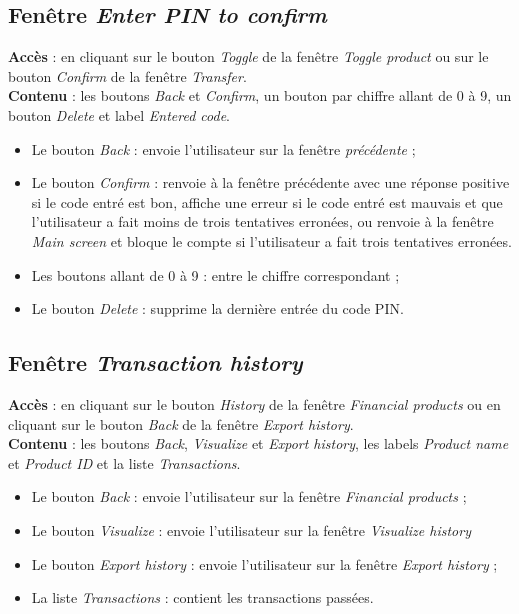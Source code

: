 \documentclass{article}
\newcommand{\navbutton}[2]{Le bouton \emph{#1} : envoie l'utilisateur sur la fenêtre \emph{#2}}
\newcommand{\access}[1]{ \noindent\textbf{Accès} : #1 \\}
\newcommand{\content}[1]{\textbf{Contenu} : #1}
\begin{document}
\subsection{Fenêtre \emph{Enter PIN to confirm}}
\access{en cliquant sur le bouton \emph{Toggle} de la fenêtre \emph{Toggle product} ou sur le bouton \emph{Confirm} de la fenêtre \emph{Transfer}.}
\content{les boutons \emph{Back} et \emph{Confirm}, un bouton par chiffre allant de 0 à 9, un bouton \emph{Delete} et label \emph{Entered code}.}
\begin{itemize}
\item \navbutton{Back}{précédente} ;
\item Le bouton \emph{Confirm} : renvoie à la fenêtre précédente avec une réponse positive si le code entré est bon, affiche une erreur si le code entré est mauvais et que l'utilisateur a fait moins de trois tentatives erronées, ou renvoie à la fenêtre \emph{Main screen} et bloque le compte si l'utilisateur a fait trois tentatives erronées.
\item Les boutons allant de 0 à 9 : entre le chiffre correspondant ;
\item Le bouton \emph{Delete} : supprime la dernière entrée du code PIN.
\end{itemize}


\subsection{Fenêtre \emph{Transaction history}}
\access{en cliquant sur le bouton \emph{History} de la fenêtre \emph{Financial products} ou en cliquant sur le bouton \emph{Back} de la fenêtre \emph{Export history}.}
\content{les boutons \emph{Back}, \emph{Visualize} et \emph{Export history}, les labels \emph{Product name} et \emph{Product ID} et la liste \emph{Transactions}.}
\begin{itemize}
\item \navbutton{Back}{Financial products} ;
\item \navbutton{Visualize}{Visualize history}
\item \navbutton{Export history}{Export history} ;
\item La liste \emph{Transactions} : contient les transactions passées.
\end{itemize}
\end{document}
